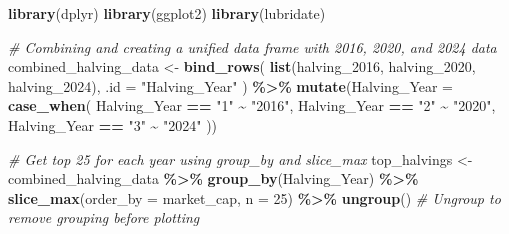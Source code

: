 \documentclass[
]{article}
\newenvironment{Shaded}{\begin{snugshade}}{\end{snugshade}}
\newcommand{\AttributeTok}[1]{\textcolor[rgb]{0.13,0.29,0.53}{#1}}
\newcommand{\CommentTok}[1]{\textcolor[rgb]{0.56,0.35,0.01}{\textit{#1}}}
\newcommand{\DecValTok}[1]{\textcolor[rgb]{0.00,0.00,0.81}{#1}}
\newcommand{\FunctionTok}[1]{\textcolor[rgb]{0.13,0.29,0.53}{\textbf{#1}}}
\newcommand{\NormalTok}[1]{#1}
\newcommand{\OtherTok}[1]{\textcolor[rgb]{0.56,0.35,0.01}{#1}}
\newcommand{\SpecialCharTok}[1]{\textcolor[rgb]{0.81,0.36,0.00}{\textbf{#1}}}
\newcommand{\StringTok}[1]{\textcolor[rgb]{0.31,0.60,0.02}{#1}}
\begin{document}
\begin{Shaded}
\begin{Highlighting}[]
\FunctionTok{library}\NormalTok{(dplyr)}
\FunctionTok{library}\NormalTok{(ggplot2)}
\FunctionTok{library}\NormalTok{(lubridate)}

\CommentTok{\# Combining and creating a unified data frame with 2016, 2020, and 2024 data}
\NormalTok{combined\_halving\_data }\OtherTok{\textless{}{-}} \FunctionTok{bind\_rows}\NormalTok{(}
  \FunctionTok{list}\NormalTok{(halving\_2016, halving\_2020, halving\_2024),}
  \AttributeTok{.id =} \StringTok{"Halving\_Year"}
\NormalTok{) }\SpecialCharTok{\%\textgreater{}\%}
  \FunctionTok{mutate}\NormalTok{(}\AttributeTok{Halving\_Year =} \FunctionTok{case\_when}\NormalTok{(}
\NormalTok{    Halving\_Year }\SpecialCharTok{==} \StringTok{"1"} \SpecialCharTok{\textasciitilde{}} \StringTok{"2016"}\NormalTok{,}
\NormalTok{    Halving\_Year }\SpecialCharTok{==} \StringTok{"2"} \SpecialCharTok{\textasciitilde{}} \StringTok{"2020"}\NormalTok{,}
\NormalTok{    Halving\_Year }\SpecialCharTok{==} \StringTok{"3"} \SpecialCharTok{\textasciitilde{}} \StringTok{"2024"}
\NormalTok{  ))}

\CommentTok{\# Get top 25 for each year using group\_by and slice\_max}
\NormalTok{top\_halvings }\OtherTok{\textless{}{-}}\NormalTok{ combined\_halving\_data }\SpecialCharTok{\%\textgreater{}\%}
  \FunctionTok{group\_by}\NormalTok{(Halving\_Year) }\SpecialCharTok{\%\textgreater{}\%}
  \FunctionTok{slice\_max}\NormalTok{(}\AttributeTok{order\_by =}\NormalTok{ market\_cap, }\AttributeTok{n =} \DecValTok{25}\NormalTok{) }\SpecialCharTok{\%\textgreater{}\%}
  \FunctionTok{ungroup}\NormalTok{()  }\CommentTok{\# Ungroup to remove grouping before plotting}


\end{Highlighting}
\end{Shaded}
\end{document}
